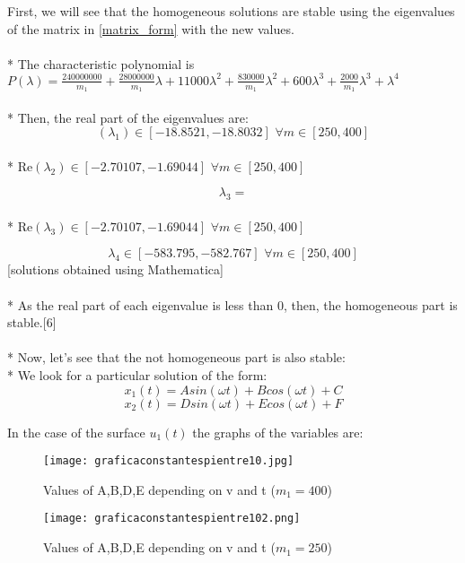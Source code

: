 \documentclass[a4paper]{article}
\begin{document}
First, we will see that the homogeneous solutions are stable using the eigenvalues
of the matrix in \ref{matrix_form} with the new values.
\\
\\*
The characteristic polynomial is\\
$
  P(\lambda) =
  \frac{240000000}{m_1} +
  \frac{28000000}{m_1} \lambda +
  11000\lambda^2 +
  \frac{830000}{m_1} \lambda^2 +
  600 \lambda^3 +
  \frac{2000}{m_1} \lambda^3 +
  \lambda^4
$
\\
\\*
Then, the real part of the eigenvalues are:
$$(\lambda_1)\in[-18.8521,-18.8032]\,\, \forall m \in [250,400]$$
\\*
Re$(\lambda_2)\in [-2.70107,-1.69044]\,\, \forall m \in [250,400]$

$$\lambda_3= $$ %
\\*
Re$(\lambda_3)\in [-2.70107,-1.69044]\,\, \forall m \in [250,400]$

\begin{equation}
	\lambda_4\in [-583.795,-582.767] \,\, \forall m \in [250,400]
\end{equation}
[solutions obtained using Mathematica]
\\
\\*
As the real part of each eigenvalue is less than 0, then, the homogeneous part is stable.[6]
\\
\\*
Now, let's see that the not homogeneous part is also stable:
\\*
We look for a particular solution of the form:
$$x_1(t)=A sin(\omega t)+B cos(\omega t)+C$$
\begin{equation}
	x_2(t)=D sin(\omega t)+E cos(\omega t)+F
\end{equation}



\newpage



In the case of the surface $u_1(t)$ the graphs of the variables are:
\begin{figure}[H]
\centering
\texttt{[image: graficaconstantespientre10.jpg]}
\caption{\label{fig:3d_u1_400}Values of A,B,D,E depending on v and t ($m_1=400$)}
\end{figure}

\begin{figure}[H]
\centering
\texttt{[image: graficaconstantespientre102.png]}
\caption{\label{fig:3d_u1_250}Values of A,B,D,E depending on v and t ($m_1=250$)}
\end{figure}
\end{document}
